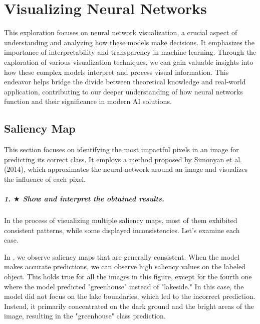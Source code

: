 \chapter{Visualizing Neural Networks}

This exploration focuses on neural network visualization, a crucial aspect of understanding and analyzing how these models make decisions. It emphasizes the importance of interpretability and transparency in machine learning. Through the exploration of various visualization techniques, we can gain valuable insights into how these complex models interpret and process visual information. This endeavor helps bridge the divide between theoretical knowledge and real-world application, contributing to our deeper understanding of how neural networks function and their significance in modern AI solutions.

\section{Saliency Map}

This section focuses on identifying the most impactful pixels in an image for predicting its correct class. It employs a method proposed by Simonyan et al. (2014), which approximates the neural network around an image and visualizes the influence of each pixel.

\paragraph*{1. $ \bigstar $ Show and interpret the obtained results.}
In the process of visualizing multiple saliency maps, most of them exhibited consistent patterns, while some displayed inconsistencies. Let's examine each case.


In , we observe saliency maps that are generally consistent. When the model makes accurate predictions, we can observe high saliency values on the labeled object. This holds true for all the images in this figure, except for the fourth one where the model predicted "greenhouse" instead of "lakeside." In this case, the model did not focus on the lake boundaries, which led to the incorrect prediction. Instead, it primarily concentrated on the dark ground and the bright areas of the image, resulting in the "greenhouse" class prediction.

